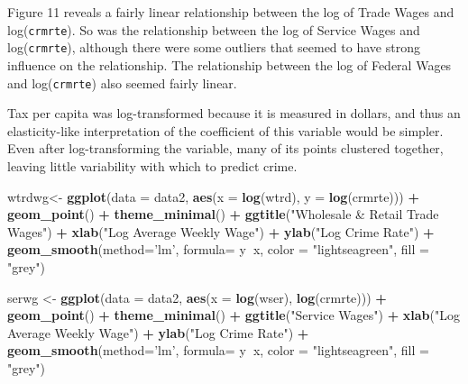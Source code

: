 \documentclass[]{article}
\newenvironment{Shaded}{\begin{snugshade}}{\end{snugshade}}
\newcommand{\DataTypeTok}[1]{\textcolor[rgb]{0.13,0.29,0.53}{#1}}
\newcommand{\KeywordTok}[1]{\textcolor[rgb]{0.13,0.29,0.53}{\textbf{#1}}}
\newcommand{\NormalTok}[1]{#1}
\newcommand{\OperatorTok}[1]{\textcolor[rgb]{0.81,0.36,0.00}{\textbf{#1}}}
\newcommand{\StringTok}[1]{\textcolor[rgb]{0.31,0.60,0.02}{#1}}
\begin{document}
Figure 11 reveals a fairly linear relationship between the log of Trade
Wages and log(\texttt{crmrte}). So was the relationship between the log
of Service Wages and log(\texttt{crmrte}), although there were some
outliers that seemed to have strong influence on the relationship. The
relationship between the log of Federal Wages and log(\texttt{crmrte})
also seemed fairly linear.

Tax per capita was log-transformed because it is measured in dollars,
and thus an elasticity-like interpretation of the coefficient of this
variable would be simpler. Even after log-transforming the variable,
many of its points clustered together, leaving little variability with
which to predict crime.

\begin{Shaded}
\begin{Highlighting}[]
\NormalTok{wtrdwg<-}\StringTok{ }\KeywordTok{ggplot}\NormalTok{(}\DataTypeTok{data =}\NormalTok{ data2, }\KeywordTok{aes}\NormalTok{(}\DataTypeTok{x =} \KeywordTok{log}\NormalTok{(wtrd), }\DataTypeTok{y =} \KeywordTok{log}\NormalTok{(crmrte))) }\OperatorTok{+}
\StringTok{  }\KeywordTok{geom_point}\NormalTok{() }\OperatorTok{+}
\StringTok{  }\KeywordTok{theme_minimal}\NormalTok{() }\OperatorTok{+}
\StringTok{  }\KeywordTok{ggtitle}\NormalTok{(}\StringTok{"Wholesale & Retail Trade Wages"}\NormalTok{) }\OperatorTok{+}\StringTok{ }
\StringTok{  }\KeywordTok{xlab}\NormalTok{(}\StringTok{"Log Average Weekly Wage"}\NormalTok{) }\OperatorTok{+}\StringTok{ }\KeywordTok{ylab}\NormalTok{(}\StringTok{"Log Crime Rate"}\NormalTok{) }\OperatorTok{+}
\StringTok{  }\KeywordTok{geom_smooth}\NormalTok{(}\DataTypeTok{method=}\StringTok{'lm'}\NormalTok{, }\DataTypeTok{formula=}\NormalTok{ y}\OperatorTok{~}\NormalTok{x, }\DataTypeTok{color =} \StringTok{"lightseagreen"}\NormalTok{, }\DataTypeTok{fill =} \StringTok{"grey"}\NormalTok{)}

\NormalTok{serwg <-}\StringTok{ }\KeywordTok{ggplot}\NormalTok{(}\DataTypeTok{data =}\NormalTok{ data2, }\KeywordTok{aes}\NormalTok{(}\DataTypeTok{x =} \KeywordTok{log}\NormalTok{(wser), }\KeywordTok{log}\NormalTok{(crmrte))) }\OperatorTok{+}
\StringTok{  }\KeywordTok{geom_point}\NormalTok{() }\OperatorTok{+}
\StringTok{  }\KeywordTok{theme_minimal}\NormalTok{() }\OperatorTok{+}
\StringTok{  }\KeywordTok{ggtitle}\NormalTok{(}\StringTok{"Service Wages"}\NormalTok{) }\OperatorTok{+}\StringTok{ }
\StringTok{  }\KeywordTok{xlab}\NormalTok{(}\StringTok{"Log Average Weekly Wage"}\NormalTok{) }\OperatorTok{+}\StringTok{ }\KeywordTok{ylab}\NormalTok{(}\StringTok{"Log Crime Rate"}\NormalTok{) }\OperatorTok{+}
\StringTok{  }\KeywordTok{geom_smooth}\NormalTok{(}\DataTypeTok{method=}\StringTok{'lm'}\NormalTok{, }\DataTypeTok{formula=}\NormalTok{ y}\OperatorTok{~}\NormalTok{x, }\DataTypeTok{color =} \StringTok{"lightseagreen"}\NormalTok{, }\DataTypeTok{fill =} \StringTok{"grey"}\NormalTok{)}


\end{Highlighting}
\end{Shaded}
\end{document}
